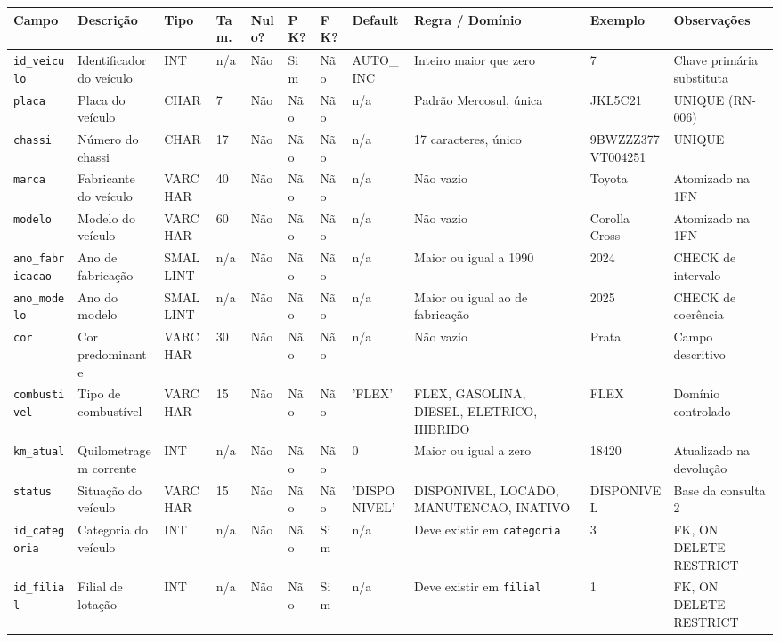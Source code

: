 \begin{table}[!t]
\begin{tabular}{|L{2.15cm}|L{2.7cm}|L{1.15cm}|C{0.62cm}|C{0.62cm}|C{0.5cm}|C{0.5cm}|L{1.45cm}|L{2.6cm}|L{2.0cm}|L{1.85cm}|}
\hline
\textbf{Campo} & \textbf{Descri\c{c}\~ao} & \textbf{Tipo} & \textbf{Tam.} & \textbf{Nulo?} & \textbf{PK?} & \textbf{FK?} & \textbf{Default} & \textbf{Regra / Dom\'inio} & \textbf{Exemplo} & \textbf{Observa\c{c}\~oes} \\
\hline
\texttt{id\_\allowbreak{}veiculo} & Identificador do ve\'iculo & INT & n/a & N\~ao & Sim & N\~ao & AUTO\_\allowbreak{}INC & Inteiro maior que zero & 7 & Chave prim\'aria substituta \\
\hline
\texttt{placa} & Placa do ve\'iculo & CHAR & 7 & N\~ao & N\~ao & N\~ao & n/a & Padr\~ao Mercosul, \'unica & JKL5C21 & UNIQUE (RN-006) \\
\hline
\texttt{chassi} & N\'umero do chassi & CHAR & 17 & N\~ao & N\~ao & N\~ao & n/a & 17 caracteres, \'unico & 9BWZZZ377VT004251 & UNIQUE \\
\hline
\texttt{marca} & Fabricante do ve\'iculo & VARCHAR & 40 & N\~ao & N\~ao & N\~ao & n/a & N\~ao vazio & Toyota & Atomizado na 1FN \\
\hline
\texttt{modelo} & Modelo do ve\'iculo & VARCHAR & 60 & N\~ao & N\~ao & N\~ao & n/a & N\~ao vazio & Corolla Cross & Atomizado na 1FN \\
\hline
\texttt{ano\_\allowbreak{}fabricacao} & Ano de fabrica\c{c}\~ao & SMALLINT & n/a & N\~ao & N\~ao & N\~ao & n/a & Maior ou igual a 1990 & 2024 & CHECK de intervalo \\
\hline
\texttt{ano\_\allowbreak{}modelo} & Ano do modelo & SMALLINT & n/a & N\~ao & N\~ao & N\~ao & n/a & Maior ou igual ao de fabrica\c{c}\~ao & 2025 & CHECK de coer\^encia \\
\hline
\texttt{cor} & Cor predominante & VARCHAR & 30 & N\~ao & N\~ao & N\~ao & n/a & N\~ao vazio & Prata & Campo descritivo \\
\hline
\texttt{combustivel} & Tipo de combust\'ivel & VARCHAR & 15 & N\~ao & N\~ao & N\~ao & 'FLEX' & FLEX, GASOLINA, DIESEL, ELETRICO, HIBRIDO & FLEX & Dom\'inio controlado \\
\hline
\texttt{km\_\allowbreak{}atual} & Quilometragem corrente & INT & n/a & N\~ao & N\~ao & N\~ao & 0 & Maior ou igual a zero & 18420 & Atualizado na devolu\c{c}\~ao \\
\hline
\texttt{status} & Situa\c{c}\~ao do ve\'iculo & VARCHAR & 15 & N\~ao & N\~ao & N\~ao & 'DISPONIVEL' & DISPONIVEL, LOCADO, MANUTENCAO, INATIVO & DISPONIVEL & Base da consulta 2 \\
\hline
\texttt{id\_\allowbreak{}categoria} & Categoria do ve\'iculo & INT & n/a & N\~ao & N\~ao & Sim & n/a & Deve existir em \texttt{categoria} & 3 & FK, ON DELETE RESTRICT \\
\hline
\texttt{id\_\allowbreak{}filial} & Filial de lota\c{c}\~ao & INT & n/a & N\~ao & N\~ao & Sim & n/a & Deve existir em \texttt{filial} & 1 & FK, ON DELETE RESTRICT \\
\hline
\end{tabular}
\end{table}

